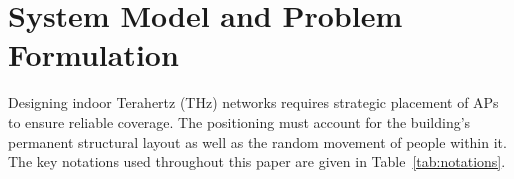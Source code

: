 \documentclass[conference]{IEEEtran}
\begin{document}
\section{System Model and Problem Formulation}

Designing indoor Terahertz (THz) networks requires strategic placement of APs to ensure reliable coverage. The positioning must account for the building's permanent structural layout as well as the random movement of people within it. The key notations used throughout this paper are given in Table~\ref{tab:notations}.


\renewcommand{\arraystretch}{1.3}

\setlength{\tabcolsep}{3pt} 
\end{document}
